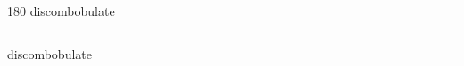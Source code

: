 
\begin{frame}
\begin{center}
\begin{turn}{180}
{\fontsize{2.5cm}{1em}\selectfont discombobulate}
\end{turn}
\vspace{1em}\par  
\hrule
\vspace{1em}\par  
{\fontsize{2.5cm}{1em}\selectfont discombobulate}
\end{center}
\end{frame}
